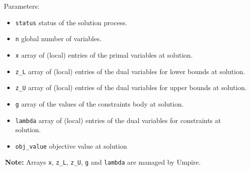 \documentclass[11pt]{article}
\newcommand{\warningSymbol}{\raisebox{0.9\depth}{\danger}}
\newcommand{\warningcp}[1]{%
        \smallskip \noindent \textcolor{warningColorText}{\warningSymbol{}}\,\textbf{#1} %
    }
\begin{document}
Parameters:
\begin{itemize}
\item \texttt{status} status of the solution process.
\item \texttt{n} global number of variables.
\item \texttt{x} array of (local) entries of the primal variables at solution.
\item \texttt{z\_L} array of (local) entries of the dual variables for lower bounds at solution.
\item \texttt{z\_U} array of (local) entries of the dual variables for upper bounds at solution.
\item \texttt{g} array of the values of the constraints body at solution.
\item \texttt{lambda} array of (local) entries of the dual variables for constraints at solution.
\item \texttt{obj\_value} objective value at solution 
\end{itemize}

\warningcp{Note:} Arrays \texttt{x}, \texttt{z\_L}, \texttt{z\_U}, \texttt{g} and \texttt{lambda} are managed by Umpire.
\end{document}
